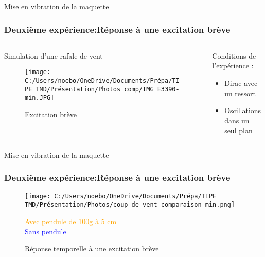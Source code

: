 \documentclass{beamer}
\begin{document}
	
	\begin{frame}{Mise en vibration de la maquette}
		\frametitle{Deuxième expérience:Réponse à une excitation brève}
		\begin{columns}
			\begin{column}{0.5\textwidth}
				\alert{Simulation d'une rafale de vent}
				\begin{figure}
					\texttt{[image: C:/Users/noebo/OneDrive/Documents/Prépa/TIPE TMD/Présentation/Photos comp/IMG\_E3390-min.JPG]}
					\caption{Excitation brève}
				\end{figure}
			\end{column}
			\begin{column}{0.5\textwidth}
				Conditions de l'expérience :
				\begin{itemize}
					\item Dirac avec un ressort 
					\item Oscillations dans un seul plan
				\end{itemize}	
			\end{column}
		\end{columns}
	\end{frame}
	
	
	
	
	\begin{frame}{Mise en vibration de la maquette}
		\frametitle{Deuxième expérience:Réponse à une excitation brève}
		\vspace{12pt}
		\begin{figure}
				\texttt{[image: C:/Users/noebo/OneDrive/Documents/Prépa/TIPE TMD/Présentation/Photos/coup de vent comparaison-min.png]}
				\caption{Réponse temporelle à une excitation brève}
				\tiny{\small{\textcolor{orange}{Avec pendule de 100g à 5 cm}\\
				\textcolor{blue}{Sans pendule}}}
			
			
	\end{figure}
	\end{frame}





	
	
	
\end{document}

